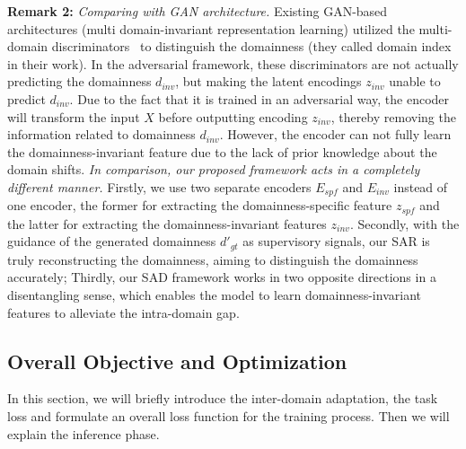 \documentclass[10pt,journal,compsoc]{IEEEtran}
\begin{document}
\noindent \textbf{Remark 2:} \textit{Comparing with GAN architecture.} 
Existing GAN-based architectures (multi domain-invariant representation learning) utilized the multi-domain discriminators~\cite{DDMRL,CIDA} to distinguish the domainness (they called domain index in their work). In the adversarial framework, these discriminators are not actually predicting the domainness $d_{inv}$, but making the latent encodings $z_{inv}$ unable to predict $d_{inv}$. Due to the fact that it is trained in an adversarial way, the encoder will transform the input $X$ before outputting encoding $z_{inv}$, thereby removing the information related to domainness $d_{inv}$. 
However, the encoder can not fully learn the domainness-invariant feature due to the lack of prior knowledge about the domain shifts. 
\textit{In comparison, our proposed framework acts in a completely different manner.} Firstly, we use two separate encoders $E_{spf}$ and $E_{inv}$ instead of one encoder, the former for extracting the domainness-specific feature $z_{spf}$ and the latter for extracting the domainness-invariant features $z_{inv}$. Secondly, with the guidance of the generated domainness $d'_{gt}$ as supervisory signals, our SAR is truly reconstructing the domainness, aiming to distinguish the domainness accurately; Thirdly,  our SAD framework works in two opposite directions in a disentangling sense, which enables the model to learn domainness-invariant features to alleviate the intra-domain gap.


\subsection{Overall Objective and Optimization}
\label{END-TO-END}
 In this section, we will briefly introduce the inter-domain adaptation, the task loss and formulate an overall loss function for the training process. Then we will explain the inference phase.
\end{document}
